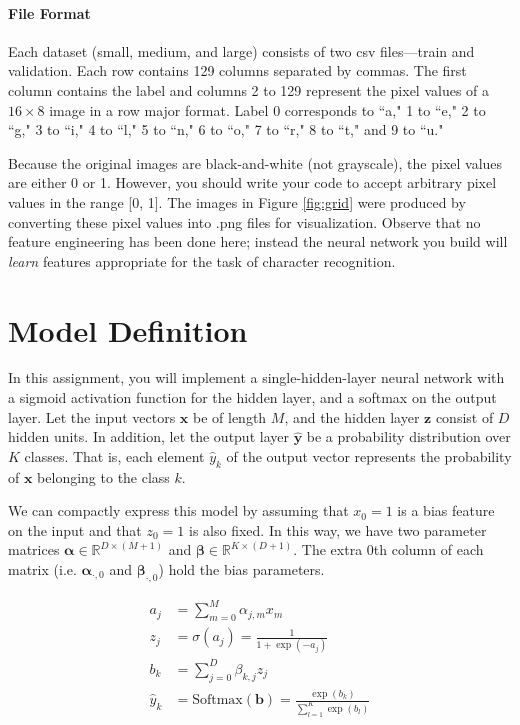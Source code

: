 \documentclass[11pt,addpoints,answers]{exam}
\newcommand{\Rb}{\mathbb{R}}
\newcommand{\xv}{\mathbf{x}}
\newcommand{\yv}{\mathbf{y}}
\newcommand{\zv}{\mathbf{z}}
\newcommand{\alphav     }{\boldsymbol \alpha     }
\newcommand{\betav      }{\boldsymbol \beta      }
\begin{document}
\paragraph{File Format} Each dataset (small, medium, and large) consists of two csv files---train and validation. Each row contains 129 columns separated by commas. The first column contains the label and columns 2 to 129 represent the pixel values of a $16 \times 8$ image in a row major format. Label 0 corresponds to ``a," 1 to ``e," 2 to ``g," 3 to ``i," 4 to ``l," 5 to ``n," 6 to ``o," 7 to ``r," 8 to ``t," and 9 to ``u."

Because the original images are black-and-white (not grayscale), the pixel values are either 0 or 1. However, you should write your code to accept arbitrary pixel values in the range [0, 1]. The images in Figure \ref{fig:grid} were produced by converting these pixel values into .png files for visualization. Observe that no feature engineering has been done here; instead the neural network you build will \emph{learn} features appropriate for the task of character recognition.

\section{Model Definition}
\label{sec:model}

In this assignment, you will implement a single-hidden-layer neural network with a sigmoid activation function for the hidden layer, and a softmax on the output layer. Let the input vectors $\xv$ be of length $M$, and the hidden layer $\zv$ consist of $D$ hidden units. In addition, let the output layer $\hat{\yv}$ be a probability distribution over $K$ classes. That is, each element $\hat{y}_k$ of the output vector represents the probability of $\xv$ belonging to the class $k$.

We can compactly express this model by assuming that $x_0=1$ is a bias feature on the input and that $z_0=1$ is also fixed. In this way, we have two parameter matrices $\alphav \in \Rb^{D \times (M+1)}$ and $\betav \in \Rb^{K \times (D+1)}$. The extra $0$th column of each matrix (i.e. $\alphav_{\cdot, 0}$ and $\betav_{\cdot, 0}$) hold the bias parameters.

\begin{align*}
a_j &= \sum_{m=0}^M \alpha_{j,m} x_m
\\
z_j &= \sigma(a_j) = \frac{1}{1+\exp(-a_j)}
\\
b_k &= \sum_{j=0}^D \beta_{k,j} z_j
\\
\hat{y}_k &= \text{Softmax}(\mathbf{b}) = \frac{\exp(b_k)}{\sum_{l=1}^K \exp(b_l)}
\\
\end{align*}
\end{document}
